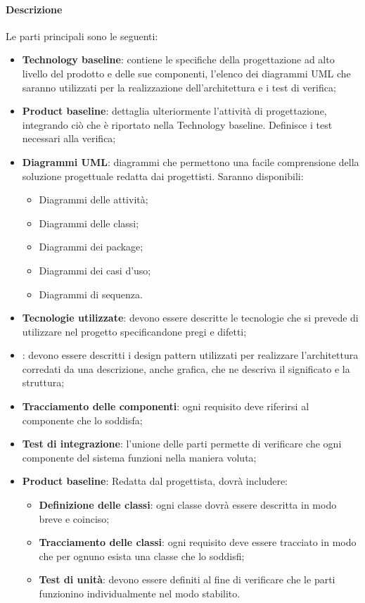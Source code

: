 \paragraph{Descrizione}
Le parti principali sono le seguenti:
\begin{itemize}
  \item \textbf{Technology baseline}: contiene le specifiche della progettazione ad alto livello del prodotto e delle sue componenti, l'elenco dei diagrammi UML che saranno utilizzati per la realizzazione dell'architettura e i test di verifica;

  \item \textbf{Product baseline}: dettaglia ulteriormente l'attività di progettazione,  integrando ciò che è riportato nella Technology baseline. Definisce i test necessari alla verifica;

  \item \textbf{Diagrammi UML}: diagrammi che permettono una facile comprensione della soluzione progettuale redatta dai progettisti. Saranno disponibili:
        \begin{itemize}
          \item Diagrammi delle attività;
          \item Diagrammi delle classi;
          \item Diagrammi dei package;
          \item Diagrammi dei casi d'uso;
          \item Diagrammi di sequenza.
        \end{itemize}
  \item \textbf{Tecnologie utilizzate}: devono essere descritte le tecnologie che si prevede di utilizzare nel progetto specificandone pregi e difetti;
  \item \textbf{}: devono essere descritti i design pattern utilizzati per realizzare l'architettura corredati da una descrizione, anche grafica, che ne descriva il significato e la struttura;
  \item \textbf{Tracciamento delle componenti}: ogni requisito deve riferirsi al componente che lo soddisfa;
  \item \textbf{Test di integrazione}: l'unione delle parti permette di verificare che ogni componente del sistema funzioni nella maniera voluta;
  \item \textbf{Product baseline}: Redatta dal progettista, dovrà includere:
        \begin{itemize}
          \item \textbf{Definizione delle classi}: ogni classe dovrà essere descritta in modo breve e coinciso;
          \item \textbf{Tracciamento delle classi}: ogni requisito deve essere tracciato in modo che per ognuno esista una classe che lo soddisfi;
          \item \textbf{Test di unità}: devono essere definiti al fine di verificare che le parti funzionino individualmente nel modo stabilito.
        \end{itemize}
\end{itemize}


